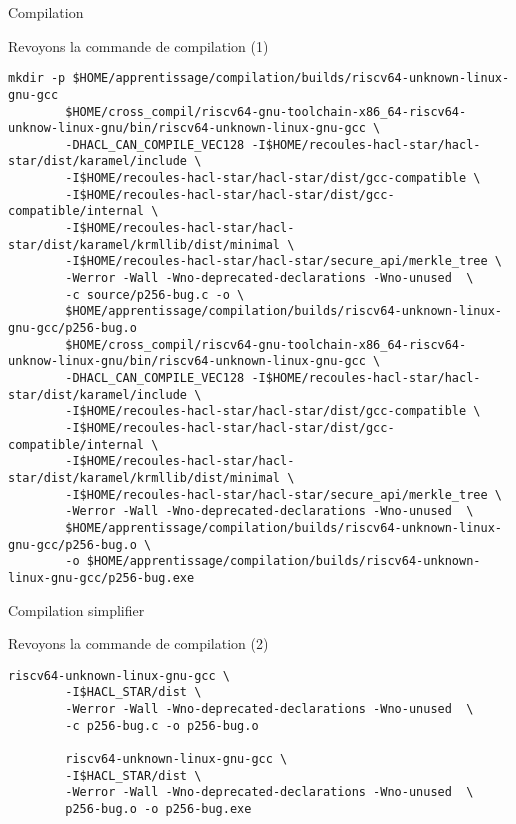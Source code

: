 \documentclass[A4,svgnames,9pt,aspectratio=169]{beamer}
\begin{document}
\begin{frame}[fragile]{Compilation}

  Revoyons la commande de compilation (1)
  
  \begin{lstlisting}[style=global, caption={Commande de compilation}, gobble=8]
        mkdir -p $HOME/apprentissage/compilation/builds/riscv64-unknown-linux-gnu-gcc
        $HOME/cross_compil/riscv64-gnu-toolchain-x86_64-riscv64-unknow-linux-gnu/bin/riscv64-unknown-linux-gnu-gcc \
        -DHACL_CAN_COMPILE_VEC128 -I$HOME/recoules-hacl-star/hacl-star/dist/karamel/include \
        -I$HOME/recoules-hacl-star/hacl-star/dist/gcc-compatible \
        -I$HOME/recoules-hacl-star/hacl-star/dist/gcc-compatible/internal \
        -I$HOME/recoules-hacl-star/hacl-star/dist/karamel/krmllib/dist/minimal \
        -I$HOME/recoules-hacl-star/hacl-star/secure_api/merkle_tree \
        -Werror -Wall -Wno-deprecated-declarations -Wno-unused  \
        -c source/p256-bug.c -o \
        $HOME/apprentissage/compilation/builds/riscv64-unknown-linux-gnu-gcc/p256-bug.o
        $HOME/cross_compil/riscv64-gnu-toolchain-x86_64-riscv64-unknow-linux-gnu/bin/riscv64-unknown-linux-gnu-gcc \
        -DHACL_CAN_COMPILE_VEC128 -I$HOME/recoules-hacl-star/hacl-star/dist/karamel/include \
        -I$HOME/recoules-hacl-star/hacl-star/dist/gcc-compatible \
        -I$HOME/recoules-hacl-star/hacl-star/dist/gcc-compatible/internal \
        -I$HOME/recoules-hacl-star/hacl-star/dist/karamel/krmllib/dist/minimal \
        -I$HOME/recoules-hacl-star/hacl-star/secure_api/merkle_tree \
        -Werror -Wall -Wno-deprecated-declarations -Wno-unused  \
        $HOME/apprentissage/compilation/builds/riscv64-unknown-linux-gnu-gcc/p256-bug.o \
        -o $HOME/apprentissage/compilation/builds/riscv64-unknown-linux-gnu-gcc/p256-bug.exe

  \end{lstlisting}
  
\end{frame}


\begin{frame}[fragile]{Compilation simplifier}

  Revoyons la commande de compilation (2)
  
  \begin{lstlisting}[style=global2, caption={Commande de compilation}, gobble=8]
        riscv64-unknown-linux-gnu-gcc \
        -I$HACL_STAR/dist \
        -Werror -Wall -Wno-deprecated-declarations -Wno-unused  \
        -c p256-bug.c -o p256-bug.o

        riscv64-unknown-linux-gnu-gcc \
        -I$HACL_STAR/dist \
        -Werror -Wall -Wno-deprecated-declarations -Wno-unused  \
        p256-bug.o -o p256-bug.exe

  \end{lstlisting}
  
\end{frame}
\end{document}
